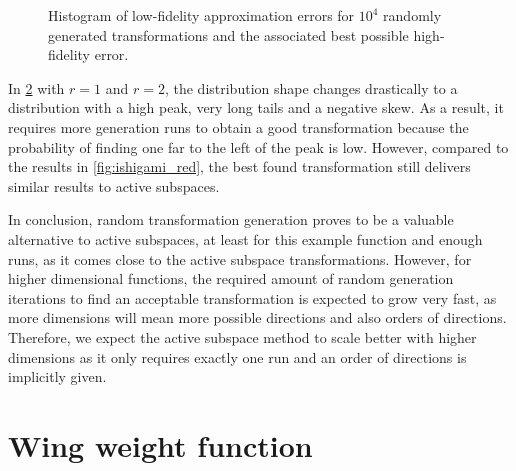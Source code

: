 \documentclass[
  a4paper,  %
  twoside,  %
  bibliography=totoc,
  headsepline,
  cleardoublepage=empty,
  parskip=half,
  draft=false
]{scrbook}
\begin{document}
\begin{mdframed}[style=style]
\begin{figure}[H]
\begin{subfigure}{.5\textwidth}
\vspace{3mm}
\label{fig:ishigami_hist_1}
\end{subfigure}
\delimit
  \caption{Histogram of low-fidelity approximation errors for $10^4$ randomly generated transformations and the associated best possible high-fidelity error.}
\label{fig:ishigami_hists_red}
\end{figure}
\end{mdframed}
%
In \cref{fig:ishigami_hists_red} with $r=1$ and $r=2$, the distribution shape changes drastically to a distribution with a high peak, very long tails and a negative skew.
As a result, it requires more generation runs to obtain a good transformation because the probability of finding one far to the left of the peak is low.
However, compared to the results in \cref{fig:ishigami_red}, the best found transformation still delivers similar results to active subspaces.

In conclusion, random transformation generation proves to be a valuable alternative to active subspaces, at least for this example function and enough runs, as it comes close to the active subspace transformations.
However, for higher dimensional functions, the required amount of random generation iterations to find an acceptable transformation is expected to grow very fast, as more dimensions will mean more possible directions and also orders of directions.
Therefore, we expect the active subspace method to scale better with higher dimensions as it only requires exactly one run and an order of directions is implicitly given.

\newpage
\section{Wing weight function}
\end{document}
